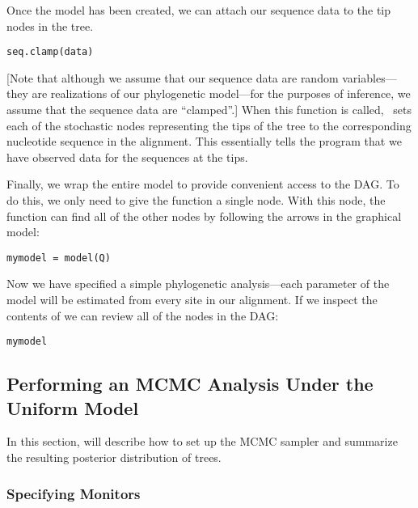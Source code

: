 Once the  model has been created, we can attach our sequence data to the tip nodes in the tree.
{\tt \begin{snugshade*}
\begin{lstlisting}
seq.clamp(data)
\end{lstlisting}
\end{snugshade*}}
[Note that although we assume that our sequence data are random variables---they are realizations of our phylogenetic model---for the purposes of inference, we assume that the sequence data are ``clamped''.]
When this function is called, \RevBayes~sets each of the stochastic nodes representing the tips of the tree to the corresponding nucleotide sequence in the alignment. 
This essentially tells the program that we have observed data for the sequences at the tips. 

Finally, we wrap the entire model to provide convenient access to the DAG. 
To do this, we only need to give the  function a single node. 
With this node, the  function can find all of the other nodes by following the arrows in the graphical model:
{\tt \begin{snugshade*}
\begin{lstlisting}
mymodel = model(Q)
\end{lstlisting}
\end{snugshade*}}

Now we have specified a simple phylogenetic analysis---each parameter of the model will be estimated from every site in our alignment.
If we inspect the contents of  we can review all of the nodes in the DAG:
{\tt \begin{snugshade*}
\begin{lstlisting}
mymodel
\end{lstlisting}
\end{snugshade*}}

\bigskip
\subsection{Performing an MCMC Analysis Under the Uniform Model}

In this section, will describe how to set up the MCMC sampler and summarize the resulting posterior distribution of trees. 

\subsubsection{Specifying Monitors}

